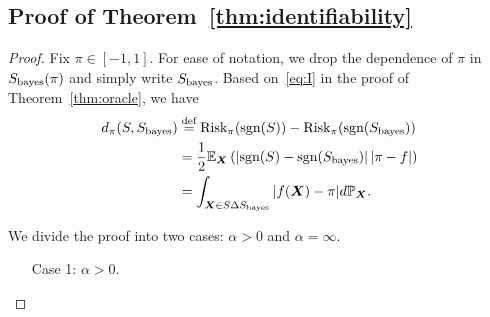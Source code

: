 \documentclass[11pt]{article}
\theoremstyle{plain}
\theoremstyle{definition}
\def\sign{\textup{sgn}}
\def\bayesS{S_{\textup{bayes}}}
\def\risk{\textup{Risk}_\pi}
\begin{document}
\subsection{Proof of Theorem~\ref{thm:identifiability}}
\begin{proof}
Fix $\pi\in[-1,1]$. For ease of notation, we drop the dependence of $\pi$ in $\bayesS(\pi)$ and simply write $\bayesS$. Based on~\eqref{eq:I} in the proof of Theorem~\ref{thm:oracle}, we have
\begin{align}\label{eq:excess}
d_\pi(S,\bayesS) &\stackrel{\text{def}}{=} \risk(\sign (S))-\risk(\sign(\bayesS))\notag \\
&={1\over 2}\mathbb{E}_{\mX}\left( \left|\sign(S)-\sign(\bayesS) \right||\pi-f| \right)\notag \\
&=\int_{\mX\in S\Delta S_{\text{bayes}}}|f(\mX)-\pi|d \mathbb{P}_{\mX}.
\end{align}

We divide the proof into two cases: $\alpha >0$ and $\alpha=\infty$. 
\begin{enumerate}[label={2.\arabic*},wide, labelwidth=!, labelindent=0pt]
\item[Case 1:] $\alpha >0$.


\end{enumerate}
\end{proof}
\end{document}
